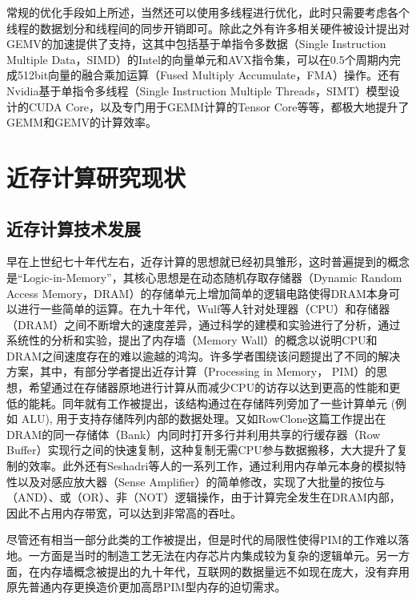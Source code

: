 常规的优化手段如上所述，当然还可以使用多线程进行优化，此时只需要考虑各个线程的数据划分和线程间的同步开销即可。除此之外有许多相关硬件被设计提出对GEMV的加速提供了支持，这其中包括基于单指令多数据（Single Instruction Multiple Data，SIMD）的Intel的向量单元和AVX指令集，可以在0.5个周期内完成512bit向量的融合乘加运算（Fused Multiply Accumulate，FMA）操作\cite{IntelAVX}。还有Nvidia基于单指令多线程（Single Instruction Multiple Threads，SIMT）模型设计的CUDA Core\cite{Cuda}，以及专门用于GEMM计算的Tensor Core\cite{TensorCore}等等，都极大地提升了GEMM和GEMV的计算效率。

\section{近存计算研究现状}

\subsection{近存计算技术发展}
早在上世纪七十年代左右，近存计算的思想就已经\cite{CellularLogicInMemory,LogicInMemory}初具雏形，这时普遍提到的概念是“Logic-in-Memory”，其核心思想是在动态随机存取存储器（Dynamic Random Access Memory，DRAM）的存储单元上增加简单的逻辑电路使得DRAM本身可以进行一些简单的运算。在九十年代，Wulf等人针对处理器（CPU）和存储器（DRAM）之间不断增大的速度差异，通过科学的建模和实验进行了分析，通过系统性的分析和实验，提出了内存墙（Memory Wall）的概念以说明CPU和DRAM之间速度存在的难以逾越的鸿沟\cite{MemoryWall}。许多学者围绕该问题提出了不同的解决方案，其中，有部分学者提出近存计算（Processing in Memory， PIM）的思想，希望通过在存储器原地进行计算从而减少CPU的访存以达到更高的性能和更低的能耗。同年就有工作\cite{MicroArchitecturePIM}被提出，该结构通过在存储阵列旁加了一些计算单元 (例如 ALU), 用于支持存储阵列内部的数据处理。又如RowClone这篇工作\cite{RowClone}提出在DRAM的同一存储体（Bank）内同时打开多行并利用共享的行缓存器（Row Buffer）实现行之间的快速复制，这种复制无需CPU参与数据搬移，大大提升了复制的效率。此外还有Seshadri等人\cite{BitAndOr,Ambit}的一系列工作，通过利用内存单元本身的模拟特性以及对感应放大器（Sense Amplifier）的简单修改，实现了大批量的按位与（AND）、或（OR）、非（NOT）逻辑操作，由于计算完全发生在DRAM内部，因此不占用内存带宽，可以达到非常高的吞吐。

尽管还有相当一部分此类的工作被提出，但是时代的局限性使得PIM的工作难以落地。一方面是当时的制造工艺无法在内存芯片内集成较为复杂的逻辑单元。另一方面，在内存墙概念被提出的九十年代，互联网的数据量远不如现在庞大，没有弃用原先普通内存更换造价更加高昂PIM型内存的迫切需求\cite{NDPWorkshop}。


